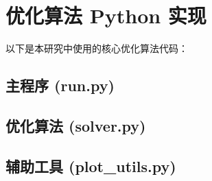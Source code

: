 \documentclass[a4paper,12pt]{article}
\newcommand{\includepy}[2]{
    \subsection{#1} 
    
}
\begin{document}
\section{优化算法 Python 实现} \label{app:code}

以下是本研究中使用的核心优化算法代码：




% 

% 

% 

\includepy{主程序 (run.py)}{codes/run.py}
\includepy{优化算法 (solver.py)}{codes/solver.py}
\includepy{辅助工具 (plot\_utils.py)}{codes/plot_utils.py}
\end{document}
